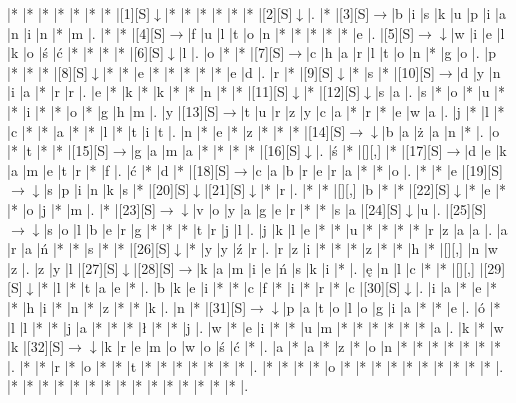 \documentclass[11pt]{article}
\newcommand\drarr{$\rightarrow \!\!\!\!\! \downarrow$}
\newcommand\rarr{$\rightarrow$}
\newcommand\darr{$\downarrow$}
\begin{document}
\noindent\begin{Puzzle}{14}{33}|*	|*	|*	|*	|*	|*	|*	|[1][S]\darr	|*	|*	|*	|*	|*	|*	|[2][S]\darr	|.
|*	|[3][S]\rarr	|b	|i	|s	|k	|u	|p	|i	|a	|n	|i	|n	|*	|m	|.
|*	|*	|[4][S]\rarr	|f	|u	|l	|t	|o	|n	|*	|*	|*	|*	|*	|e	|.
|[5][S]\drarr	|w	|i	|e	|l	|k	|o	|ś	|ć	|*	|*	|*	|*	|[6][S]\darr	|l	|.
|o	|*	|*	|[7][S]\rarr	|c	|h	|a	|r	|l	|t	|o	|n	|*	|g	|o	|.
|p	|*	|*	|*	|[8][S]\darr	|*	|*	|e	|*	|*	|*	|*	|*	|e	|d	|.
|r	|*	|[9][S]\darr	|*	|s	|*	|[10][S]\rarr	|d	|y	|n	|i	|a	|*	|r	|r	|.
|e	|*	|k	|*	|k	|*	|*	|n	|*	|*	|[11][S]\darr	|*	|[12][S]\darr	|s	|a	|.
|s	|*	|o	|*	|u	|*	|*	|i	|*	|*	|o	|*	|g	|h	|m	|.
|y	|[13][S]\rarr	|t	|u	|r	|z	|y	|c	|a	|*	|r	|*	|e	|w	|a	|.
|j	|*	|l	|*	|c	|*	|*	|a	|*	|*	|l	|*	|t	|i	|t	|.
|n	|*	|e	|*	|z	|*	|*	|*	|[14][S]\drarr	|b	|a	|ż	|a	|n	|*	|.
|o	|*	|t	|*	|*	|[15][S]\rarr	|g	|a	|m	|a	|*	|*	|*	|*	|[16][S]\darr	|.
|ś	|*	|[][,]{ }	|*	|[17][S]\rarr	|d	|e	|k	|a	|m	|e	|t	|r	|*	|f	|.
|ć	|*	|d	|*	|[18][S]\rarr	|c	|a	|b	|r	|e	|r	|a	|*	|*	|o	|.
|*	|*	|e	|[19][S]\drarr	|s	|p	|i	|n	|k	|s	|*	|[20][S]\darr	|[21][S]\darr	|*	|r	|.
|*	|*	|[][,]{ }	|b	|*	|*	|[22][S]\darr	|*	|e	|*	|*	|o	|j	|*	|m	|.
|*	|[23][S]\drarr	|v	|o	|y	|a	|g	|e	|r	|*	|*	|s	|a	|[24][S]\darr	|u	|.
|[25][S]\drarr	|s	|o	|l	|b	|e	|r	|g	|*	|*	|*	|t	|r	|j	|l	|.
|j	|k	|l	|e	|*	|*	|u	|*	|*	|*	|*	|r	|z	|a	|a	|.
|a	|r	|a	|ń	|*	|*	|s	|*	|*	|[26][S]\darr	|*	|y	|y	|ź	|r	|.
|r	|z	|i	|*	|*	|*	|z	|*	|*	|h	|*	|[][,]{ }	|n	|w	|z	|.
|z	|y	|l	|[27][S]\darr	|[28][S]\rarr	|k	|a	|m	|i	|e	|ń	|s	|k	|i	|*	|.
|ę	|n	|l	|c	|*	|*	|[][,]{ }	|[29][S]\darr	|*	|l	|*	|t	|a	|e	|*	|.
|b	|k	|e	|i	|*	|*	|c	|f	|*	|i	|*	|r	|*	|c	|[30][S]\darr	|.
|i	|a	|*	|e	|*	|*	|h	|i	|*	|n	|*	|z	|*	|*	|k	|.
|n	|*	|[31][S]\drarr	|p	|a	|t	|o	|l	|o	|g	|i	|a	|*	|*	|e	|.
|ó	|*	|l	|l	|*	|*	|j	|a	|*	|*	|*	|ł	|*	|*	|j	|.
|w	|*	|e	|i	|*	|*	|u	|m	|*	|*	|*	|*	|*	|*	|a	|.
|k	|*	|w	|k	|[32][S]\drarr	|k	|r	|e	|m	|o	|w	|o	|ś	|ć	|*	|.
|a	|*	|a	|*	|z	|*	|o	|n	|*	|*	|*	|*	|*	|*	|*	|.
|*	|*	|r	|*	|o	|*	|*	|t	|*	|*	|*	|*	|*	|*	|*	|.
|*	|*	|*	|*	|o	|*	|*	|*	|*	|*	|*	|*	|*	|*	|*	|.
|*	|*	|*	|*	|*	|*	|*	|*	|*	|*	|*	|*	|*	|*	|*	|.\end{Puzzle}

\newpage
\end{document}
